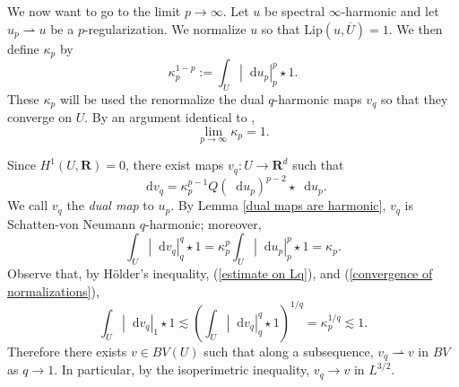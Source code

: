 \documentclass[reqno,11pt]{amsart}
\newcommand{\RR}{\mathbf{R}}
\newcommand*\dif{\mathop{}\!\mathrm{d}}
\newcommand{\Lip}{\mathrm{Lip}}
\newcommand{\dfn}[1]{\emph{#1}\index{#1}}
\newcommand{\weakto}{\rightharpoonup}
\theoremstyle{definition}
\numberwithin{equation}{section}
\begin{document}
We now want to go to the limit $p \to \infty$.
Let $u$ be spectral $\infty$-harmonic and let $u_p \weakto u$ be a $p$-regularization.
We normalize $u$ so that $\Lip(u, \overline U) = 1$.
We then define $\kappa_p$ by 
\begin{equation}\label{normalization condition}
\kappa_p^{1 - p} := \int_U |\dif u_p|_{p}^p \star 1.
\end{equation}
These $\kappa_p$ will be used the renormalize the dual $q$-harmonic maps $v_q$ so that they converge on $U$.
By an argument identical to \cite[Lemma 6.1]{daskalopoulos2022analytic},
\begin{equation}\label{convergence of normalizations}
\lim_{p \to \infty} \kappa_p = 1.
\end{equation}

Since $H^1(U, \RR) = 0$, there exist maps $v_q: U \to \RR^d$ such that
\begin{equation}\label{normalized dual map}
\dif v_q = \kappa_p^{p - 1} Q(\dif u_p)^{p - 2} \star \dif u_p.
\end{equation}
We call $v_q$ the \dfn{dual map} to $u_p$.
By Lemma \ref{dual maps are harmonic}, $v_q$ is Schatten-von Neumann $q$-harmonic; moreover,
\begin{equation}\label{estimate on Lq}
\int_U |\dif v_q|_{q}^q \star 1 = \kappa_p^p \int_U |\dif u_p|_{p}^p \star 1 = \kappa_p.
\end{equation}
Observe that, by H\"older's inequality, (\ref{estimate on Lq}), and (\ref{convergence of normalizations}),
$$\int_U |\dif v_q|_{1} \star 1 \lesssim \left(\int_U |\dif v_q|_{q}^q \star 1\right)^{1/q} = \kappa_p^{1/q} \lesssim 1.$$
Therefore there exists $v \in BV(U)$ such that along a subsequence, $v_q \weakto v$ in $BV$ as $q \to 1$.
In particular, by the isoperimetric inequality, $v_q \to v$ in $L^{3/2}$.
\end{document}

